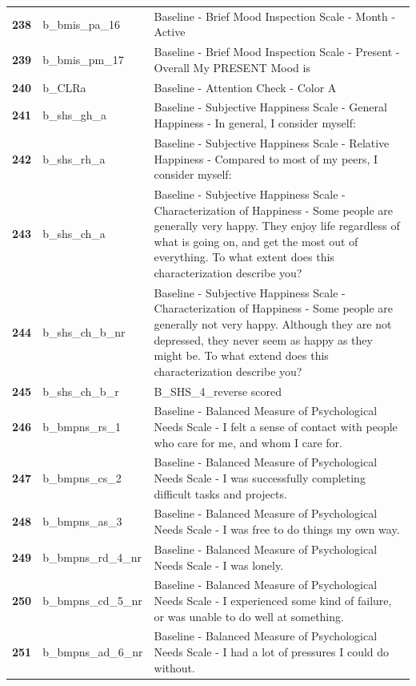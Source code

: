 \documentclass[
  letterpaper,
  DIV=11,
  numbers=noendperiod]{scrartcl}
\begin{document}
\begin{longtable}[t]{>{}cll}
\textbf{238} & b\_bmis\_pa\_16 & Baseline - Brief Mood Inspection Scale - Month - Active\\
\textbf{239} & b\_bmis\_pm\_17 & Baseline - Brief Mood Inspection Scale - Present - Overall My PRESENT Mood is\\
\textbf{240} & b\_CLRa & Baseline - Attention Check - Color A\\
\addlinespace
\textbf{241} & b\_shs\_gh\_a & Baseline - Subjective Happiness Scale - General Happiness - In general, I consider myself:\\
\textbf{242} & b\_shs\_rh\_a & Baseline - Subjective Happiness Scale - Relative Happiness - Compared to most of my peers, I consider myself:\\
\textbf{243} & b\_shs\_ch\_a & Baseline - Subjective Happiness Scale - Characterization of Happiness - Some people are generally very happy. They enjoy life regardless of what is going on, and get the most out of everything. To what extent does this characterization describe you?\\
\textbf{244} & b\_shs\_ch\_b\_nr & Baseline - Subjective Happiness Scale - Characterization of Happiness - Some people are generally not very happy. Although they are not depressed, they never seem as happy as they might be. To what extend does this characterization describe you?\\
\textbf{245} & b\_shs\_ch\_b\_r & B\_SHS\_4\_reverse scored\\
\addlinespace
\textbf{246} & b\_bmpns\_rs\_1 & Baseline - Balanced Measure of Psychological Needs Scale - I felt a sense of contact with people who care for me, and whom I care for.\\
\textbf{247} & b\_bmpns\_cs\_2 & Baseline - Balanced Measure of Psychological Needs Scale - I was successfully completing difficult tasks and projects.\\
\textbf{248} & b\_bmpns\_as\_3 & Baseline - Balanced Measure of Psychological Needs Scale - I was free to do things my own way.\\
\textbf{249} & b\_bmpns\_rd\_4\_nr & Baseline - Balanced Measure of Psychological Needs Scale - I was lonely.\\
\textbf{250} & b\_bmpns\_cd\_5\_nr & Baseline - Balanced Measure of Psychological Needs Scale - I experienced some kind of failure, or was unable to do well at something.\\
\addlinespace
\textbf{251} & b\_bmpns\_ad\_6\_nr & Baseline - Balanced Measure of Psychological Needs Scale - I had a lot of pressures I could do without.\\

\end{longtable}
\end{document}
